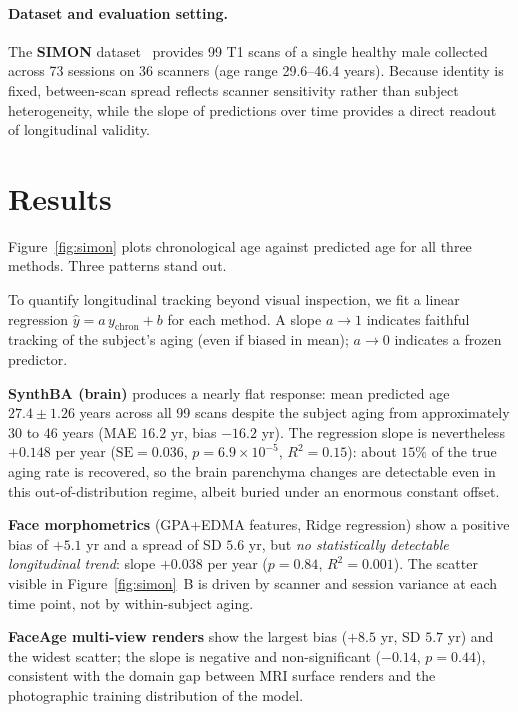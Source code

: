 \documentclass{midl} %
\begin{document}
\paragraph{Dataset and evaluation setting.}
The \textbf{SIMON} dataset~\citep{duchesne2019simon} provides 99 T1 scans of a single
healthy male collected across 73 sessions on 36 scanners (age range
29.6--46.4 years).  Because identity is fixed, between-scan spread reflects
scanner sensitivity rather than subject heterogeneity, while the slope of
predictions over time provides a direct readout of longitudinal validity.

\section{Results}

Figure~\ref{fig:simon} plots chronological age against predicted age for all
three methods.  Three patterns stand out.

To quantify longitudinal tracking beyond visual inspection, we fit a
linear regression $\hat{y} = a\,y_{\text{chron}} + b$ for each method.
A slope $a{\to}1$ indicates faithful tracking of the subject's aging
(even if biased in mean); $a{\to}0$ indicates a frozen predictor.

\textbf{SynthBA (brain)} produces a nearly flat response: mean predicted
age $27.4 \pm 1.26$ years across all 99 scans despite the subject aging
from approximately $30$ to $46$ years (MAE $16.2$ yr, bias $-16.2$ yr).
The regression slope is nevertheless $+0.148$ per year
($\mathrm{SE}{=}0.036$, $p{=}6.9\times 10^{-5}$, $R^{2}{=}0.15$): about
$15\%$ of the true aging rate is recovered, so the brain parenchyma
changes are detectable even in this out-of-distribution regime, albeit
buried under an enormous constant offset.

\textbf{Face morphometrics} (GPA+EDMA features, Ridge regression) show a
positive bias of $+5.1$ yr and a spread of SD $5.6$ yr, but \emph{no
statistically detectable longitudinal trend}: slope $+0.038$ per year
($p{=}0.84$, $R^{2}{=}0.001$).  The scatter visible in
Figure~\ref{fig:simon}~B is driven by scanner and session variance at
each time point, not by within-subject aging.

\textbf{FaceAge multi-view renders} show the largest bias ($+8.5$ yr,
SD $5.7$ yr) and the widest scatter; the slope is negative and
non-significant ($-0.14$, $p{=}0.44$), consistent with the domain gap
between MRI surface renders and the photographic training distribution
of the model.
\end{document}
